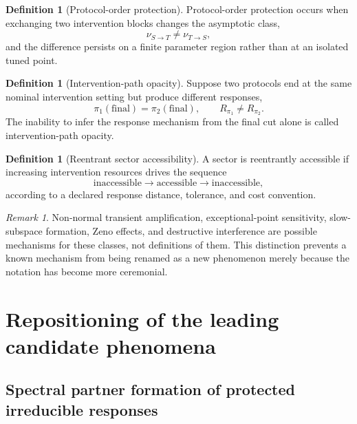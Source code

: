 \documentclass[11pt]{article}
\theoremstyle{definition}
\newtheorem{definition}[theorem]{Definition}
\theoremstyle{remark}
\newtheorem{remark}[theorem]{Remark}
\begin{document}
\begin{definition}[Protocol-order protection]\label{def:protocol-order}
Protocol-order protection occurs when exchanging two intervention blocks changes the asymptotic class,
\begin{equation}
\nu_{S\rightarrow T}\neq\nu_{T\rightarrow S},
\label{eq:protocol-order}
\end{equation}
and the difference persists on a finite parameter region rather than at an isolated tuned point.
\end{definition}

\begin{definition}[Intervention-path opacity]\label{def:path-opacity}
Suppose two protocols end at the same nominal intervention setting but produce different responses,
\begin{equation}
\pi_1(\mathrm{final})=\pi_2(\mathrm{final}),
\qquad
R_{\pi_1}\neq R_{\pi_2}.
\label{eq:path-opacity}
\end{equation}
The inability to infer the response mechanism from the final cut alone is called intervention-path opacity.
\end{definition}

\begin{definition}[Reentrant sector accessibility]\label{def:reentrant}
A sector is reentrantly accessible if increasing intervention resources drives the sequence
\begin{equation}
\text{inaccessible}
\longrightarrow
\text{accessible}
\longrightarrow
\text{inaccessible},
\label{eq:reentrant}
\end{equation}
according to a declared response distance, tolerance, and cost convention.
\end{definition}

\begin{remark}
Non-normal transient amplification, exceptional-point sensitivity, slow-subspace formation, Zeno effects, and destructive interference are possible mechanisms for these classes, not definitions of them. This distinction prevents a known mechanism from being renamed as a new phenomenon merely because the notation has become more ceremonial.
\end{remark}

\section{Repositioning of the leading candidate phenomena}

\subsection{Spectral partner formation of protected irreducible responses}
\end{document}

